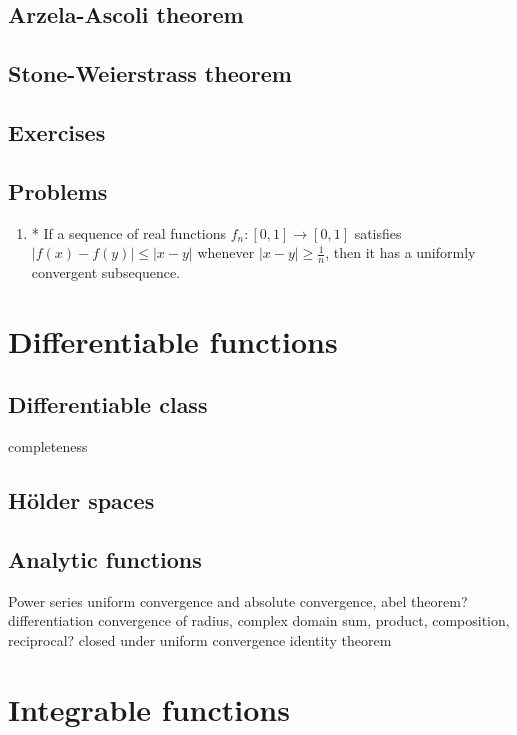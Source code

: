 \documentclass{../../large}
\begin{document}
\section{Arzela-Ascoli theorem}
\section{Stone-Weierstrass theorem}

\section*{Exercises}
\begin{prb}
\end{prb}
\section*{Problems}
\begin{enumerate}
\item* If a sequence of real functions $f_n\colon[0,1]\to[0,1]$ satisfies $|f(x)-f(y)|\le|x-y|$ whenever $|x-y|\ge\frac1n$, then it has a uniformly convergent subsequence.
\end{enumerate}

\chapter{Differentiable functions}
\section{Differentiable class}
completeness
\section{H\"older spaces}

\section{Analytic functions}

Power series
uniform convergence and absolute convergence, abel theorem?
differentiation
convergence of radius, complex domain
sum, product, composition, reciprocal?
closed under uniform convergence
identity theorem






\chapter{Integrable functions}
\end{document}
